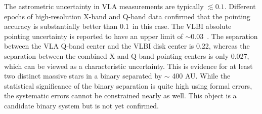 The astrometric uncertainty in VLA measurements are typically
$\lesssim0.1$\arcsec. Different epochs of high-resolution X-band and Q-band
data confirmed that the pointing accuracy is substantially better than
0.1\arcsec\ in this case.  The VLBI absolute pointing uncertainty is reported
to have an upper limit of $\sim 0.03$\arcsec\ \citep{Minier2000}.  The
separation between the VLA Q-band center and the VLBI disk center is
0.22\arcsec, whereas the separation between the combined X and Q band pointing
centers is only 0.027\arcsec, which can be viewed as a characteristic
uncertainty. This is evidence for at least two distinct massive stars in a
binary separated by $\sim$ 400 AU.  While the statistical significance of the
binary separation is quite high using formal errors, the systematic errors
cannot be constrained nearly as well.  This object is a candidate binary system
but is not yet confirmed.


